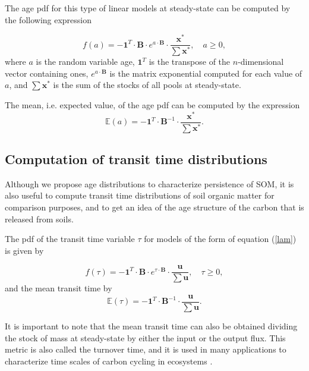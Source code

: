 \documentclass[draft,linenumbers]{agujournal}
\begin{document}
The age pdf for this type of linear models at steady-state can be computed by the following expression \citep{Metzler2018MG}

\begin{equation} \label{agepdf}
f(a) = - \mathbf{1}^{T} \cdot \mathbf{B} \cdot e^{a \cdot \mathbf{B}} \cdot \frac{{\bm x}^{\ast}}{\sum {\bm x}^{\ast}}, \quad a \geq 0,
\end{equation}
where $a$ is the random variable age, $\mathbf{1}^{T}$ is the transpose of the $n$-dimensional vector containing ones, $e^{a \cdot \mathbf{B}}$ is the matrix exponential computed for each value of $a$, and $\sum{\bm x}^{\ast}$ is the sum of the stocks of all pools at steady-state. 

The mean, i.e. expected value, of the age pdf can be computed by the expression
\begin{equation} \label{meanage}
\mathbb{E}(a) = - \mathbf{1}^{T} \cdot \mathbf{B}^{-1} \cdot \frac{{\bm x}^{\ast}}{\sum {\bm x}^{\ast}}.
\end{equation}

\subsection{Computation of transit time distributions}
Although we propose age distributions to characterize persistence of SOM, it is also useful to compute transit time distributions of soil organic matter for comparison purposes, and to get an idea of the age structure of the carbon that is released from soils. 

The pdf of the transit time variable $\tau$ for models of the form of equation (\ref{lam}) is given by \citep{Metzler2018MG}

\begin{equation} \label{ttpdf}
f(\tau) = - \mathbf{1}^{T} \cdot \mathbf{B} \cdot e^{\tau \cdot \mathbf{B}} \cdot \frac{{\bm u}}{\sum {\bm u}}, \quad \tau \geq 0,
\end{equation}
and the mean transit time by
\begin{equation} \label{meantt}
\mathbb{E}(\tau) = - \mathbf{1}^{T} \cdot \mathbf{B}^{-1} \cdot \frac{{\bm u}}{\sum {\bm u}}.
\end{equation}

It is important to note that the mean transit time can also be obtained dividing the stock of mass at steady-state by either the input or the output flux. This metric is also called the turnover time, and it is used in many applications to characterize time scales of carbon cycling in ecosystems \citep{Sierra2017}. 
\end{document}
